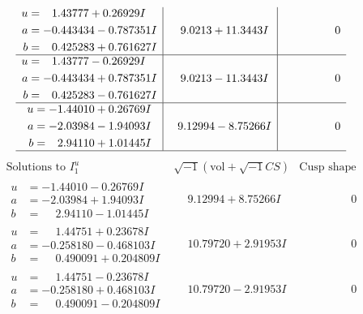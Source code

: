\documentclass[1p]{elsarticle_modified}
\theoremstyle{definition}
\newcommand{\I}{\sqrt{-1}}
\begin{document}
$$\begin{array}{c|c|c}
\begin{aligned}
u &= \phantom{-}1.43777 + 0.26929 I \\
a &= -0.443434 - 0.787351 I \\
b &= \phantom{-}0.425283 + 0.761627 I\end{aligned}
 & \phantom{-}9.0213 + 11.3443 I & \phantom{-0.000000 } 0 \\ \hline\begin{aligned}
u &= \phantom{-}1.43777 - 0.26929 I \\
a &= -0.443434 + 0.787351 I \\
b &= \phantom{-}0.425283 - 0.761627 I\end{aligned}
 & \phantom{-}9.0213 - 11.3443 I & \phantom{-0.000000 } 0 \\ \hline\begin{aligned}
u &= -1.44010 + 0.26769 I \\
a &= -2.03984 - 1.94093 I \\
b &= \phantom{-}2.94110 + 1.01445 I\end{aligned}
 & \phantom{-}9.12994 - 8.75266 I & \phantom{-0.000000 } 0\\
 \hline 
 \end{array}$$\newpage$$\begin{array}{c|c|c}  
\text{Solutions to }I^u_{1}& \I (\text{vol} + \sqrt{-1}CS) & \text{Cusp shape}\\
 \hline 
\begin{aligned}
u &= -1.44010 - 0.26769 I \\
a &= -2.03984 + 1.94093 I \\
b &= \phantom{-}2.94110 - 1.01445 I\end{aligned}
 & \phantom{-}9.12994 + 8.75266 I & \phantom{-0.000000 } 0 \\ \hline\begin{aligned}
u &= \phantom{-}1.44751 + 0.23678 I \\
a &= -0.258180 - 0.468103 I \\
b &= \phantom{-}0.490091 + 0.204809 I\end{aligned}
 & \phantom{-}10.79720 + 2.91953 I & \phantom{-0.000000 } 0 \\ \hline\begin{aligned}
u &= \phantom{-}1.44751 - 0.23678 I \\
a &= -0.258180 + 0.468103 I \\
b &= \phantom{-}0.490091 - 0.204809 I\end{aligned}
 & \phantom{-}10.79720 - 2.91953 I & \phantom{-0.000000 } 0 \\ \hline\begin{aligned}

\end{aligned}
\end{array}$$
\end{document}
